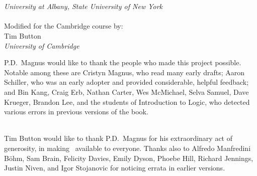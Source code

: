 \thispagestyle{empty}
\noindent {\HUGE\forallx}

\


\vfill


\\
\emph{University at Albany, State University of New York}\\
\\
{Modified for the Cambridge course by:\\ Tim Button}\\
\emph{University of Cambridge}



\newpage
\thispagestyle{empty}%
\noindent P.D.\ Magnus would like to thank the people who made this project possible. Notable among these are Cristyn Magnus, who read many early drafts; Aaron Schiller, who was an early adopter and provided considerable, helpful feedback; {and} Bin Kang, Craig Erb, Nathan Carter, Wes McMichael, Selva Samuel,  Dave Krueger, Brandon Lee, and the students of Introduction to Logic, who detected various errors in previous versions of the book.

\
\\
Tim Button would like to thank P.D.\ Magnus for his extraordinary act of generosity, in making \forallx\ available to everyone. Thanks also to Alfredo Manfredini B\"{o}hm, Sam Brain, Felicity Davies, Emily Dyson, Phoebe Hill, Richard Jennings, Justin Niven,  and Igor Stojanovic for noticing errata in earlier versions.

